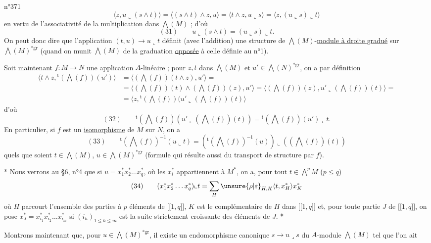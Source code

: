 \hfill n°371
\[
\langle z,u\llcorner(s\wedge t)\rangle=\langle(s\wedge t)\wedge z,u\rangle=\langle t\wedge z,u\llcorner s\rangle=\langle z,(u\llcorner s)\llcorner t\rangle
\]
en vertu de l'associativité de la multiplication dans $\bigwedge(M)$ ; d'où
\[
(31)\qquad u\llcorner(s\wedge t)=(u\llcorner s)\llcorner t.
\]
On peut donc dire que l'application $(t,u)\longrightarrow u\llcorner t$ définit (avec l'addition) une structure de $\bigwedge(M)$-\uline{module à droite gradué} sur $\bigwedge(M)^{*\mathrm{gr}}$ (quand on munit $\bigwedge(M)$ de la graduation \uline{opposée} à celle définie au n°1).

Soit maintenant $f:M\longrightarrow N$ une application $A$-linéaire ; pour $z,t$ dans $\bigwedge(M)$ et $u'\in\bigwedge(N)^{*\mathrm{gr}}$, on a par définition
\[
\begin{aligned}
\langle t\wedge z,{}^{\mathrm t}(\bigwedge(f))(u')\rangle&=\langle(\bigwedge(f))(t\wedge z),u'\rangle=\\
&=\langle(\bigwedge(f))(t)\wedge(\bigwedge(f))(z),u'\rangle=\langle(\bigwedge(f))(z),u'\llcorner(\bigwedge(f))(t)\rangle=\\
&=\langle z,{}^{\mathrm t}(\bigwedge(f))(u'\llcorner(\bigwedge(f))(t)\rangle
\end{aligned}
\]
d'où
\[
(32)\qquad{}^{\mathrm t}(\bigwedge(f))(u'\llcorner(\bigwedge(f))(t))={}^{\mathrm t}(\bigwedge(f))(u')\llcorner t.
\]
En particulier, si $f$ est un \uline{isomorphisme} de $M$ sur $N$, on a
\[
(33)\qquad{}^{\mathrm t}(\bigwedge(f))^{-1}(u\llcorner t)=({}^{\mathrm t}(\bigwedge(f))^{-1}(u))\llcorner((\bigwedge(f))(t))
\]
quels que soient $t\in\bigwedge(M)$, $u\in\bigwedge(M)^{*\mathrm{gr}}$ (formule qui résulte aussi du transport de structure par $f$).

* Nous verrons au §6, n°4 que si $u=x_1^*x_2^*\ldots x_q^*$, où les $x_i^*$ appartiennent à $M^*$, on a, pour tout $t\in\bigwedge^pM$ ($p\leq q$)
\[
(34)\qquad(x_1^*x_2^*\ldots x_q^*)\llcorner t=\sum_H\unsure{\rho|\varepsilon}_{H,K}\langle t,x_H^*\rangle x_K^*
\]
où $H$ parcourt l'ensemble des parties à $p$ éléments de $\lbrack\!\lbrack1,q\rbrack\!\rbrack$, $K$ est le complémentaire de $H$ dans $\lbrack\!\lbrack1,q\rbrack\!\rbrack$ et, pour toute partie $J$ de $\lbrack\!\lbrack1,q\rbrack\!\rbrack$, on pose $x_J^*=x_{i_1}^*x_{i_2}^*\ldots x_{i_m}^*$ si $(i_h)_{1\leq h\leq m}$ est la suite strictement croissante des éléments de $J$. *

Montrons maintenant que, pour $u\in\bigwedge(M)^{*\mathrm{gr}}$, il existe un endomorphisme canonique $s\longrightarrow u\lrcorner s$ du $A$-module $\bigwedge(M)$ tel que l'on ait
